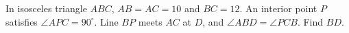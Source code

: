 In isosceles triangle $ABC$, $AB=AC=10$ and $BC=12$. An interior point $P$ satisfies $\angle APC=90^\circ$. Line $BP$ meets $AC$ at $D$, and $\angle ABD=\angle PCB$. Find $BD$.
